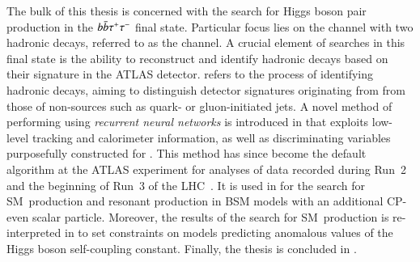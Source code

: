 The bulk of this thesis is concerned with the search for Higgs boson pair
production in the $b\bar{b}\tau^{+} \tau^{-}$ final state. Particular focus lies on the
channel with two hadronic \taulepton decays, referred to as the \hadhad channel.
A crucial element of searches in this final state is the ability to reconstruct
and identify hadronic \taulepton decays based on their signature in the ATLAS
detector. \emph{\Tauid} refers to the process of identifying hadronic \taulepton
decays, aiming to distinguish detector signatures originating from \tauhad from
those of non-\tauhad sources such as quark- or gluon-initiated jets. A novel
method of performing \tauid using \emph{recurrent neural networks} is introduced
in  that exploits low-level tracking and calorimeter
information, as well as discriminating variables purposefully constructed for
\tauid. This method has since become the default \tauid algorithm at the ATLAS
experiment for analyses of data recorded during Run~2 and the beginning of Run~3
of the LHC~\cite{ATL-PHYS-PUB-2019-033,ATL-PHYS-PUB-2022-044}. It is used in
 for the search for SM~\HH production and resonant \HH
production in BSM models with an additional CP-even scalar particle. Moreover,
the results of the search for SM~\HH production is re-interpreted in
 to set constraints on models predicting anomalous
values of the Higgs boson self-coupling constant. Finally, the thesis is
concluded in .


